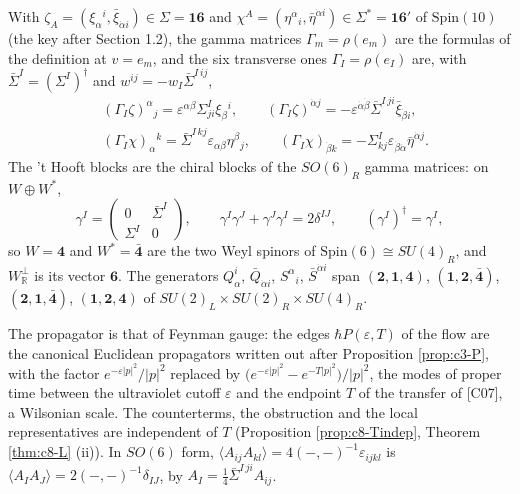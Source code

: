 \begin{remark}
With $\zeta_A=(\xi_\alpha{}^i,\bar\xi_{\dot\alpha i})\in\Sigma=\mathbf{16}$ and $\chi^A=(\eta^\alpha{}_i,\bar\eta^{\dot\alpha i})\in\Sigma^*=\mathbf{16}'$ of $\mathrm{Spin}(10)$ (the key after Section 1.2), the gamma matrices $\Gamma_m=\rho(e_m)$ are the formulas of the definition at $v=e_m$, and the six transverse ones $\Gamma_I=\rho(e_I)$ are, with $\bar\Sigma^I=(\Sigma^I)^\dagger$ and $w^{ij}=-w_I\bar\Sigma^{I\,ij}$,
\[
\begin{aligned}&(\Gamma_I\zeta)^\alpha{}_j=\varepsilon^{\alpha\beta}\Sigma^I_{ji}\xi_\beta{}^i,\qquad (\Gamma_I\zeta)^{\dot\alpha j}=-\varepsilon^{\dot\alpha\dot\beta}\bar\Sigma^{I\,ji}\bar\xi_{\dot\beta i},\\ &(\Gamma_I\chi)_\alpha{}^k=\bar\Sigma^{I\,kj}\varepsilon_{\alpha\beta}\eta^\beta{}_j,\qquad (\Gamma_I\chi)_{\dot\beta k}=-\Sigma^I_{kj}\varepsilon_{\dot\beta\dot\alpha}\bar\eta^{\dot\alpha j}.\end{aligned}
\]
The 't Hooft blocks are the chiral blocks of the $SO(6)_R$ gamma matrices: on $W\oplus W^*$,
\[
\gamma^I=\begin{pmatrix}0&\bar\Sigma^I\\ \Sigma^I&0\end{pmatrix},\qquad \gamma^I\gamma^J+\gamma^J\gamma^I=2\delta^{IJ},\qquad (\gamma^I)^\dagger=\gamma^I,
\]
so $W=\mathbf4$ and $W^*=\bar{\mathbf4}$ are the two Weyl spinors of $\mathrm{Spin}(6)\cong SU(4)_R$, and $W_{\mathbb R}^\perp$ is its vector $\mathbf6$. The generators $Q^i_\alpha$, $\bar Q_{\dot\alpha i}$, $S^\alpha{}_i$, $\bar S^{\dot\alpha i}$ span $(\mathbf2,\mathbf1,\mathbf4)$, $(\mathbf1,\mathbf2,\bar{\mathbf4})$, $(\mathbf2,\mathbf1,\bar{\mathbf4})$, $(\mathbf1,\mathbf2,\mathbf4)$ of $SU(2)_L\times SU(2)_R\times SU(4)_R$.
\end{remark}

\begin{remark}
The propagator is that of Feynman gauge: the edges $\hbar P(\varepsilon,T)$ of the flow are the canonical Euclidean propagators written out after Proposition \ref{prop:c3-P}, with the factor $e^{-\varepsilon|p|^2}/|p|^2$ replaced by $\big(e^{-\varepsilon|p|^2}-e^{-T|p|^2}\big)/|p|^2$, the modes of proper time between the ultraviolet cutoff $\varepsilon$ and the endpoint $T$ of the transfer of [C07], a Wilsonian scale. The counterterms, the obstruction and the local representatives are independent of $T$ (Proposition \ref{prop:c8-Tindep}, Theorem \ref{thm:c8-L} (ii)). In $SO(6)$ form, $\langle A_{ij}A_{kl}\rangle=4(-,-)^{-1}\varepsilon_{ijkl}$ is $\langle A_IA_J\rangle=2(-,-)^{-1}\delta_{IJ}$, by $A_I=\tfrac14\bar\Sigma^{I\,ji}A_{ij}$.
\end{remark}

